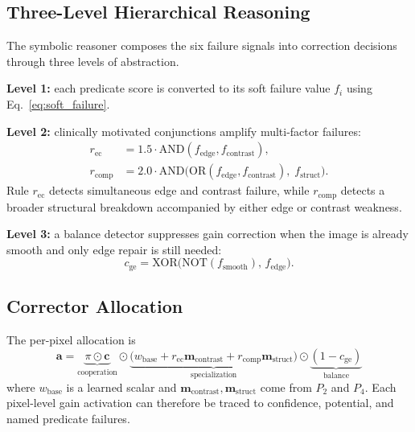 \documentclass{ieeetj}
\begin{document}
\subsection{Three-Level Hierarchical Reasoning}
The symbolic reasoner composes the six failure signals into correction decisions through three levels of abstraction.

\textbf{Level 1:} each predicate score is converted to its soft failure value $f_i$ using Eq.~\eqref{eq:soft_failure}.

\textbf{Level 2:} clinically motivated conjunctions amplify multi-factor failures:
\begin{align}
r_\text{ec} &= 1.5 \cdot \text{AND}(f_\text{edge}, f_\text{contrast}), \label{eq:compound1} \\
r_\text{comp} &= 2.0 \cdot \text{AND}\!\big(\text{OR}(f_\text{edge}, f_\text{contrast}),\; f_\text{struct}\big). \label{eq:compound2}
\end{align}
Rule $r_\text{ec}$ detects simultaneous edge and contrast failure, while $r_\text{comp}$ detects a broader structural breakdown accompanied by either edge or contrast weakness.

\textbf{Level 3:} a balance detector suppresses gain correction when the image is already smooth and only edge repair is still needed:
\begin{equation}
c_\text{ge} = \text{XOR}\!\big(\text{NOT}(f_\text{smooth}),\, f_\text{edge}\big).
\label{eq:balance}
\end{equation}

\subsection{Corrector Allocation}
The per-pixel allocation is
\begin{equation}
\mathbf{a} = \underbrace{\pi \odot \mathbf{c}}_{\text{cooperation}} \odot \underbrace{\big(w_{\text{base}} + r_{\text{ec}}\mathbf{m}_{\text{contrast}} + r_{\text{comp}}\mathbf{m}_{\text{struct}}\big)}_{\text{specialization}} \odot \underbrace{(1 - c_{\text{ge}})}_{\text{balance}}
\label{eq:allocation}
\end{equation}
where $w_\text{base}$ is a learned scalar and $\mathbf{m}_\text{contrast},\mathbf{m}_\text{struct}$ come from $P_2$ and $P_4$. Each pixel-level gain activation can therefore be traced to confidence, potential, and named predicate failures.
\end{document}
